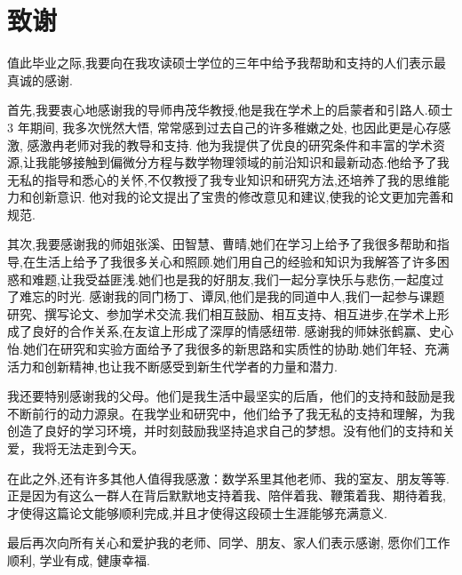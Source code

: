 \chapter{致谢}
值此毕业之际,我要向在我攻读硕士学位的三年中给予我帮助和支持的人们表示最真诚的感谢.

首先,我要衷心地感谢我的导师冉茂华教授,他是我在学术上的启蒙者和引路人.硕士 3 年期间, 我多次恍然大悟, 常常感到过去自己的许多稚嫩之处, 也因此更是心存感激, 感激冉老师对我的教导和支持.
他为我提供了优良的研究条件和丰富的学术资源,让我能够接触到偏微分方程与数学物理领域的前沿知识和最新动态.他给予了我无私的指导和悉心的关怀,不仅教授了我专业知识和研究方法,还培养了我的思维能力和创新意识.
他对我的论文提出了宝贵的修改意见和建议,使我的论文更加完善和规范.

其次,我要感谢我的师姐张溪、田智慧、曹晴,她们在学习上给予了我很多帮助和指导,在生活上给予了我很多关心和照顾.她们用自己的经验和知识为我解答了许多困惑和难题,让我受益匪浅.她们也是我的好朋友,我们一起分享快乐与悲伤,一起度过了难忘的时光.
感谢我的同门杨丁、谭凤,他们是我的同道中人,我们一起参与课题研究、撰写论文、参加学术交流.我们相互鼓励、相互支持、相互进步,在学术上形成了良好的合作关系,在友谊上形成了深厚的情感纽带.
感谢我的师妹张鹤赢、史心怡.她们在研究和实验方面给予了我很多的新思路和实质性的协助.她们年轻、充满活力和创新精神,也让我不断感受到新生代学者的力量和潜力.

我还要特别感谢我的父母。他们是我生活中最坚实的后盾，他们的支持和鼓励是我不断前行的动力源泉。在我学业和研究中，他们给予了我无私的支持和理解，为我创造了良好的学习环境，并时刻鼓励我坚持追求自己的梦想。没有他们的支持和关爱，我将无法走到今天。

在此之外,还有许多其他人值得我感激：数学系里其他老师、我的室友、朋友等等.正是因为有这么一群人在背后默默地支持着我、陪伴着我、鞭策着我、期待着我,才使得这篇论文能够顺利完成,并且才使得这段硕士生涯能够充满意义.

最后再次向所有关心和爱护我的老师、同学、朋友、家人们表示感谢, 愿你们工作顺利, 学业有成, 健康幸福.

